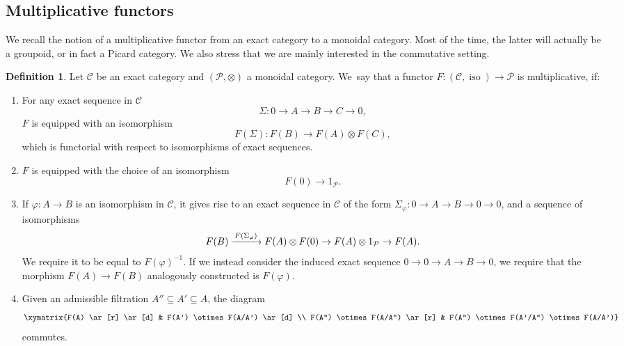 \documentclass[11pt]{article}
\newcommand\To[1]{\mathchoice{\xrightarrow{\kern1pt#1\kern1pt}}{\stackrel{#1}{\longrightarrow}}{}{}}
\theoremstyle{plain}
\theoremstyle{definition}
\newtheorem{definition}[theorem]{Definition}
\newcommand{\Ccal}{\mathcal C}
\newcommand{\Pcal}{\mathcal P}
\DeclareMathOperator{\iso}{iso}
\begin{document}
\subsection{Multiplicative functors}\label{subsec:multfunctor}
We recall the notion of a multiplicative functor from an exact category to a monoidal category. Most of the time, the latter will actually be a groupoid, or in fact a Picard category. We also stress that we are mainly interested in the commutative setting.
\begin{definition}\label{def:multiplicative-functor}
Let $\Ccal$ be an exact category and $(\Pcal,\otimes)$ a monoidal category. We~say that a functor $F: (\Ccal, \iso) \to \Pcal$ is multiplicative, if:
\begin{enumerate}
\item\label{item:mult-funct-1} For any exact sequence in $\Ccal$
\begin{displaymath}
\Sigma\colon 0 \to A \to B \to C \to 0,
\end{displaymath}
$F$ is equipped with an isomorphism
\begin{displaymath}
F(\Sigma): F(B) \to F(A) \otimes F(C),
\end{displaymath}
which is functorial with respect to isomorphisms of exact sequences.
\item\label{item:mult-funct-2} $F$ is equipped with the choice of an isomorphism
\begin{displaymath}
F(0) \to 1_{\Pcal}.
\end{displaymath}
\item\label{item:mult-funct-3} If $\varphi\colon A \to B$ is an isomorphism in $\Ccal$, it gives rise to an exact sequence in $\Ccal$ of the form $\Sigma_{\varphi}: 0 \to A \to B \to 0 \to 0$, and a sequence of isomorphisms
\begin{displaymath}
F(B) \To{F(\Sigma_{\varphi})} F(A) \otimes F(0) \to F(A) \otimes 1_{\Pcal} \to F(A).
\end{displaymath}
We require it to be equal to $F(\varphi)^{-1}$. If we instead consider the induced exact sequence $0 \to 0 \to A \to B \to 0$, we require that the morphism $F(A) \to F(B)$ analogously constructed is $F(\varphi)$.
\item\label{item:mult-funct-4} Given an admissible filtration $A'' \subseteq A' \subseteq A$, the diagram
\begin{displaymath}
\xymatrix{F(A) \ar[r] \ar[d] & F(A') \otimes F(A/A') \ar[d] \\
F(A'') \otimes F(A/A'') \ar[r] & F(A'') \otimes F(A'/A'') \otimes F(A/A')}
\end{displaymath}
commutes.


\end{enumerate}
\end{definition}
\end{document}
